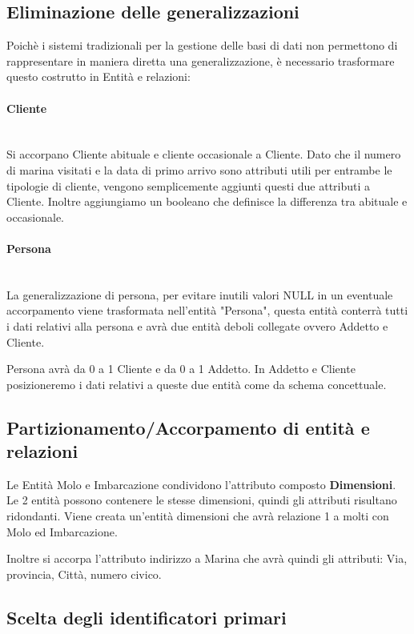 \subsection{Eliminazione delle generalizzazioni}

Poichè i sistemi tradizionali per la gestione delle basi di dati non permettono di rappresentare in maniera diretta una generalizzazione, è necessario trasformare questo costrutto in Entità e relazioni:

\paragraph{Cliente}\mbox{}\\
Si accorpano Cliente abituale e cliente occasionale a Cliente. Dato che il numero di marina visitati e la data di primo arrivo sono attributi utili per entrambe le tipologie di cliente, vengono semplicemente aggiunti questi due attributi a Cliente. Inoltre aggiungiamo un booleano che definisce la differenza tra abituale e occasionale.
\paragraph{Persona}\mbox{}\\
La generalizzazione di persona, per evitare inutili valori NULL in un eventuale accorpamento viene trasformata nell'entità "Persona", questa entità conterrà tutti i dati relativi alla persona e avrà due entità deboli collegate ovvero Addetto e Cliente.

Persona avrà da 0 a 1 Cliente e da 0 a 1 Addetto. In Addetto e Cliente posizioneremo i dati relativi a queste due entità come da schema concettuale.

\subsection{Partizionamento/Accorpamento di entità e relazioni}

Le Entità Molo e Imbarcazione condividono l'attributo composto \textbf{Dimensioni}. Le 2 entità possono contenere le stesse dimensioni, quindi gli attributi risultano ridondanti. Viene creata un'entità dimensioni che avrà relazione 1 a molti con Molo ed Imbarcazione.

Inoltre si accorpa l'attributo indirizzo a Marina che avrà quindi gli attributi: Via, provincia, Città, numero civico.

\subsection{Scelta degli identificatori primari}

